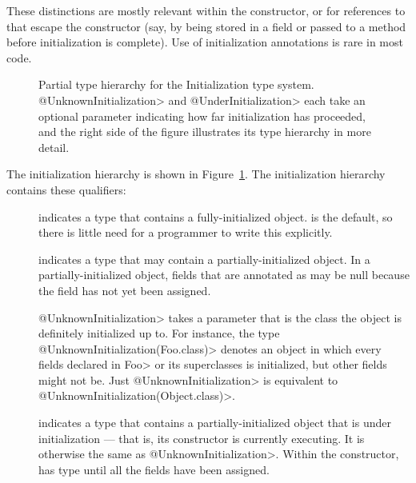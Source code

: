 These distinctions are mostly relevant within the constructor, or for
references to  that escape the constructor (say, by being stored
in a field or passed to a method before initialization is complete).
Use of initialization annotations is rare in most code.



\begin{figure}
\caption{Partial type hierarchy for the Initialization type system.
  \<@UnknownInitialization> and \<@UnderInitialization> each take an
  optional parameter indicating how far initialization has proceeded, and
  the right side of the figure illustrates its type hierarchy in more detail.}
\label{fig-initialization-hierarchy}
\end{figure}

The initialization hierarchy is shown in Figure~\ref{fig-initialization-hierarchy}.
The initialization hierarchy contains these qualifiers:

\begin{description}

\item[]
  indicates a type that contains a fully-initialized object.  
  is the default, so there is little need for a programmer to write this
  explicitly.

\item[]
  indicates a type that may contain a partially-initialized object.  In a
  partially-initialized object, fields that are annotated as
   may be null because the field
  has not yet been assigned.

  \<@UnknownInitialization> takes a parameter that is the class the object
  is definitely initialized up to.  For instance, the type
  \<@UnknownInitialization(Foo.class)> denotes an object in which every
  fields declared in \<Foo> or its superclasses is initialized, but other
  fields might not be.
  Just \<@UnknownInitialization> is equivalent to
  \<@UnknownInitialization(Object.class)>.

\item[]
  indicates a type that contains a partially-initialized object that is
  under initialization --- that is, its constructor is currently executing.
  It is otherwise the same as \<@UnknownInitialization>.  Within the
  constructor,  has
   type until
  all the  fields have been assigned.

\end{description}

